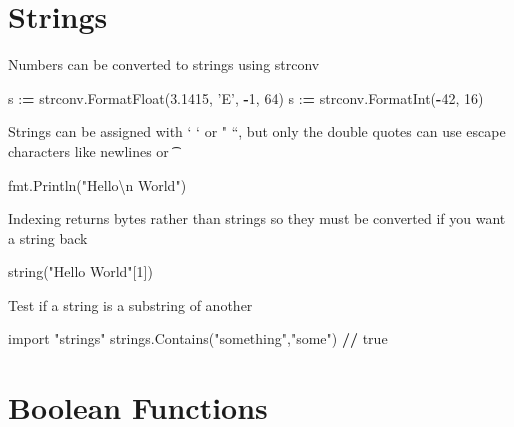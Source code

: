 \documentclass[]{book}
\newenvironment{Shaded}{\begin{snugshade}}{\end{snugshade}}
\newcommand{\DecValTok}[1]{\textcolor[rgb]{0.00,0.00,0.81}{#1}}
\newcommand{\FloatTok}[1]{\textcolor[rgb]{0.00,0.00,0.81}{#1}}
\newcommand{\CharTok}[1]{\textcolor[rgb]{0.31,0.60,0.02}{#1}}
\newcommand{\StringTok}[1]{\textcolor[rgb]{0.31,0.60,0.02}{#1}}
\newcommand{\ImportTok}[1]{#1}
\newcommand{\OperatorTok}[1]{\textcolor[rgb]{0.81,0.36,0.00}{\textbf{#1}}}
\newcommand{\NormalTok}[1]{#1}
\begin{document}
\section{Strings}\label{strings}

Numbers can be converted to strings using strconv

\begin{Shaded}
\begin{Highlighting}[]
\NormalTok{s :}\OperatorTok{=}\NormalTok{ strconv.FormatFloat(}\FloatTok{3.1415}\NormalTok{, }\StringTok{'E'}\NormalTok{, }\OperatorTok{-}\DecValTok{1}\NormalTok{, }\DecValTok{64}\NormalTok{)}
\NormalTok{s :}\OperatorTok{=}\NormalTok{ strconv.FormatInt(}\OperatorTok{-}\DecValTok{42}\NormalTok{, }\DecValTok{16}\NormalTok{)}
\end{Highlighting}
\end{Shaded}

Strings can be assigned with ` ` or " ``, but only the double quotes can
use escape characters like newlines \n or \t

\begin{Shaded}
\begin{Highlighting}[]
\NormalTok{fmt.Println(}\StringTok{"Hello}\CharTok{\textbackslash{}n}\StringTok{ World"}\NormalTok{)}
\end{Highlighting}
\end{Shaded}

Indexing returns bytes rather than strings so they must be converted if
you want a string back

\begin{Shaded}
\begin{Highlighting}[]
\NormalTok{string(}\StringTok{"Hello World"}\NormalTok{[}\DecValTok{1}\NormalTok{])}
\end{Highlighting}
\end{Shaded}

Test if a string is a substring of another

\begin{Shaded}
\begin{Highlighting}[]
\ImportTok{import} \StringTok{"strings"}
\NormalTok{strings.Contains(}\StringTok{"something"}\NormalTok{,}\StringTok{"some"}\NormalTok{) }\OperatorTok{//}\NormalTok{ true}
\end{Highlighting}
\end{Shaded}

\section{Boolean Functions}\label{boolean-functions}
\end{document}
